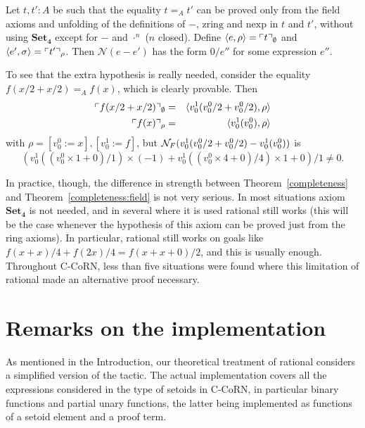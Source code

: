 \documentclass[numreferences]{kluwer}
\newcommand{\N}{\ensuremath{\mathcal{N}}}
\newcommand{\NF}{\ensuremath{{\cal N}_{F}}}
\newcommand{\tacticname}[1]{\textsf{#1}}
\newcommand{\rational}{\tacticname{rational}}
\newcommand{\zring}{\ensuremath{\mathrm{zring}}}
\newcommand{\nexp}{\ensuremath{\mathrm{nexp}}}
\newcommand{\axiom}[1]{\ensuremath{\mathbf{#1}}}
\newcommand{\mlfn}[2]{\ensuremath\ulcorner{#1}\urcorner_{#2}}
\begin{document}
\begin{article}
\begin{theorem}\label{completeness:field}
Let $t,t':A$ be such that the equality $t=_A t'$ can be proved
only from the field axioms and unfolding of the definitions of $-$,
$\zring$ and $\nexp$ in $t$ and $t'$, without using \axiom{Set_4} except
for $-$ and $\cdot^n$ ($n$ closed).  Define
$\langle e,\rho\rangle=\mlfn{t}{\emptyset}$ and
$\langle e',\sigma\rangle=\mlfn{t'}{\rho}$.  Then $\N(e-e')$ has the form
$0/e''$ for some expression $e''$.
\end{theorem}

\begin{example}
To see that the extra hypothesis is really needed, consider the equality
$f(x/2+x/2)=_Af(x)$, which is clearly provable.  Then
\begin{eqnarray*}
\mlfn{f(x/2+x/2)}{\emptyset} & = &
  \langle v^1_0(v^0_0/2+v^0_0/2),\rho\rangle \\
\mlfn{f(x)}{\rho} & = &
  \langle v^1_0(v^0_0),\rho\rangle
\end{eqnarray*}
with $\rho=[v^0_0:=x],[v^1_0:=f]$, but 
$\NF(v^1_0(v^0_0/2+v^0_0/2)-v^1_0(v^0_0))$ is
\[(v^1_0((v^0_0\times 1+0)/1)\times(-1)+v^1_0((v^0_0\times 4+0)/4)\times1+0)/1%
\neq0.\]
\end{example}

In practice, though, the difference in strength between
Theorem~\ref{completeness} and Theorem~\ref{completeness:field} is not
very serious.  In most situations axiom \axiom{Set_4} is not needed,
and in several where it is used {\rational} still works (this will be
the case whenever the hypothesis of this axiom can be proved just from
the ring axioms).  In particular, {\rational} still works on goals
like $f(x+x)/4+f(2x)/4=f(x+x+0)/2$, and this is usually enough.
Throughout C-CoRN, less than five situations were found where this
limitation of {\rational} made an alternative proof necessary.

\section{Remarks on the implementation}\label{extensions}

As mentioned in the Introduction, our theoretical treatment of {\rational}
considers a simplified version of the tactic.
The actual implementation covers all the expressions considered in the
type of setoids in C-CoRN, in particular binary functions and partial unary
functions, the latter being implemented as functions of a setoid element
and a proof term.


\end{article}
\end{document}
